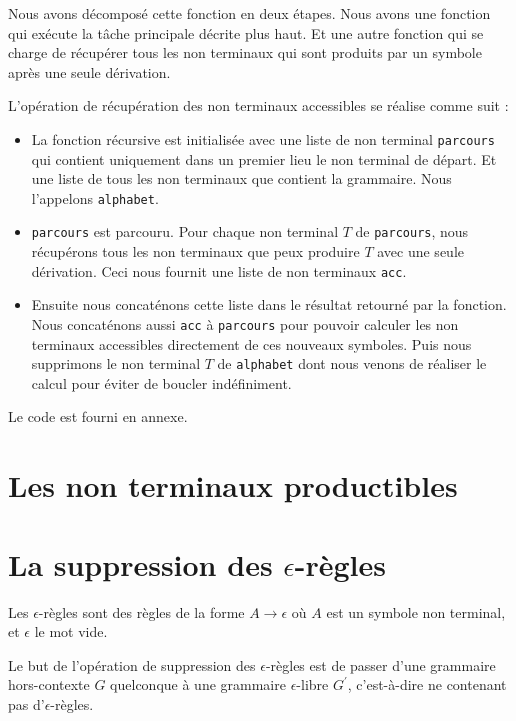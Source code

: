 \documentclass[11pt,a4paper]{article}
\def\code#1{\texttt{#1}} %
\begin{document}
Nous avons décomposé cette fonction en deux étapes. Nous avons une
fonction qui exécute la tâche principale décrite plus haut. Et une
autre fonction qui se charge de récupérer tous les non terminaux
qui sont produits par un symbole après une seule dérivation.

L'opération de récupération des non terminaux accessibles se réalise
comme suit :

\begin{itemize}
    \item La fonction récursive est initialisée avec une liste
    de non terminal \code{parcours} qui contient uniquement
    dans un premier lieu le non terminal de départ.
    Et une liste de tous les non terminaux que contient
    la grammaire. Nous l'appelons \code{alphabet}.
    \item \code{parcours} est parcouru. Pour chaque non terminal $T$
    de \code{parcours}, nous récupérons tous les non terminaux
    que peux produire $T$ avec une seule dérivation. Ceci nous fournit
    une liste de non terminaux \code{acc}.
    \item Ensuite nous concaténons cette liste dans le résultat
    retourné par la fonction. Nous concaténons aussi \code{acc}
    à \code{parcours} pour pouvoir calculer les non terminaux
    accessibles directement de ces nouveaux symboles.
    Puis nous supprimons le non terminal $T$ de \code{alphabet}
    dont nous venons de réaliser le calcul pour éviter de boucler indéfiniment.
\end{itemize}

Le code est fourni en annexe.

\newpage

\section{Les non terminaux productibles}

\newpage

\section{La suppression des $\epsilon$-règles}

Les $\epsilon$-règles sont des règles de la forme
$A \rightarrow \epsilon$ où $A$ est un symbole non
terminal, et $\epsilon$ le mot vide.

Le but de l'opération de suppression des $\epsilon$-règles
est de passer d'une grammaire hors-contexte $G$ quelconque
à une grammaire $\epsilon$-libre $G^\prime$, c'est-à-dire ne
contenant pas d'$\epsilon$-règles.
\end{document}
